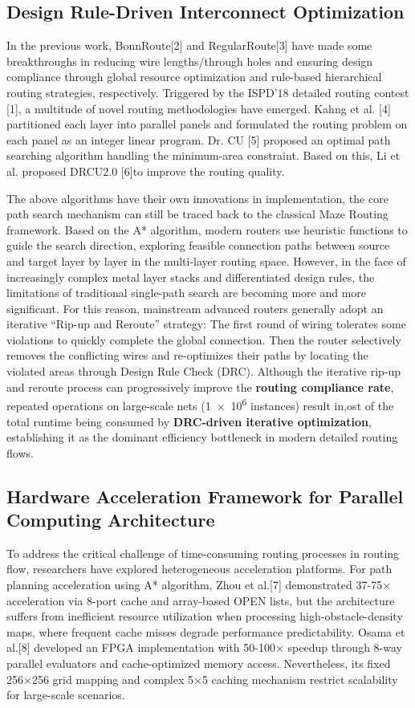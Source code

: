 \subsection{Design Rule-Driven Interconnect Optimization}
In the previous work, BonnRoute[2] and RegularRoute[3] have made some breakthroughs in reducing wire lengths/through holes and ensuring design compliance through global resource optimization and rule-based hierarchical routing strategies, respectively. 
Triggered by the ISPD'18 detailed routing contest [1], a multitude of novel routing methodologies have emerged. Kahng et al. [4] partitioned each layer into parallel panels and formulated the routing problem on each panel as an integer linear program. Dr. CU [5] proposed an optimal path searching algorithm handling the minimum-area constraint. 
Based on this, Li et al. proposed DRCU2.0 [6]to improve the routing quality.

The above algorithms have their own innovations in implementation, the core path search mechanism can still be traced back to the classical Maze Routing framework. 
Based on the A* algorithm, modern routers use heuristic functions to guide the search direction, exploring feasible connection paths between source and target layer by layer in the multi-layer routing space. However, 
in the face of increasingly complex metal layer stacks and differentiated design rules, the limitations of traditional single-path search are becoming more and more significant.
For this reason, mainstream advanced routers generally adopt an iterative “Rip-up and Reroute” strategy: 
The first round of wiring tolerates some violations to quickly complete the global connection.
Then the router selectively removes the conflicting wires and re-optimizes their paths by locating the violated areas through Design Rule Check (DRC). 
Although the iterative rip-up and reroute process can progressively improve the \textbf{routing compliance rate}, repeated operations on large-scale nets (\num{1e6} instances) result in,ost of the total runtime being consumed by \textbf{DRC-driven iterative optimization}, establishing it as the dominant efficiency bottleneck in modern detailed routing flows.

\subsection{Hardware Acceleration Framework for Parallel Computing Architecture}
To address the critical challenge of time-consuming routing processes in routing flow, researchers have explored heterogeneous acceleration platforms. 
For path planning acceleration using A* algorithm, Zhou et al.[7] demonstrated 37-75× acceleration via 8-port cache and array-based OPEN lists, but the architecture suffers from inefficient resource utilization when processing high-obstacle-density maps, where frequent cache misses degrade performance predictability. 
Osama et al.[8] developed an FPGA implementation with 50-100× speedup through 8-way parallel evaluators and cache-optimized memory access. Nevertheless, its fixed 256×256 grid mapping and complex 5×5 caching mechanism restrict scalability for large-scale scenarios. 

